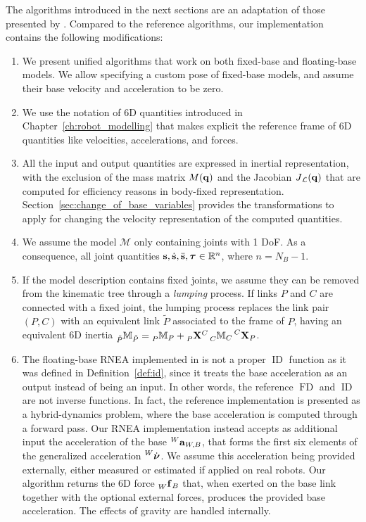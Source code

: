 The algorithms introduced in the next sections are an adaptation of those presented by \textcite{featherstone_rigid_2008}.
Compared to the reference algorithms, our implementation contains the following modifications:
%
\begin{enumerate}
%
\item We present unified algorithms that work on both fixed-base and floating-base models.
We allow specifying a custom pose of fixed-base models, and assume their base velocity and acceleration to be zero.
%
\item We use the notation of 6D quantities introduced in Chapter~\ref{ch:robot_modelling} that makes explicit the reference frame of 6D quantities like velocities, accelerations, and forces.
%
\item All the input and output quantities are expressed in inertial representation, with the exclusion of the mass matrix $M(\Qu)$ and the Jacobian $\jac_\mathcal{L}(\Qu)$ that are computed for efficiency reasons in body-fixed representation.
Section~\ref{sec:change_of_base_variables} provides the transformations to apply for changing the velocity representation of the computed quantities.
%
\item We assume the model $\mathcal{M}$ only containing joints with 1 \ac{DoF}.
As a consequence, all joint quantities $\Shape, \Shaped, \Shapedd, \Torques \in \realn^n$, where $n = N_B - 1$.
%
\item If the model description contains fixed joints, we assume they can be removed from the kinematic tree through a \emph{lumping} process.
If links $P$ and $C$ are connected with a fixed joint, the lumping process replaces the link pair $(P, C)$ with an equivalent link $\tilde{P}$ associated to the frame of $P$, having an equivalent 6D inertia $\masssix[\tilde{P}]_{\tilde{P}} = \masssix[P]_P + \transfor[P]^C \masssix[C]_C \transvel[C]_P$.
%
\item The floating-base \ac{RNEA} implemented in \textcite[Section 9.5]{featherstone_rigid_2008} is not a proper $\operatorname{ID}$ function as it was defined in Definition~\ref{def:id}, since it treats the base acceleration as an output instead of being an input.
In other words, the reference $\operatorname{FD}$ and $\operatorname{ID}$ are not inverse functions.
In fact, the reference implementation is presented as a hybrid-dynamics problem, where the base acceleration is computed through a forward pass.
Our \acs{RNEA} implementation instead accepts as additional input the acceleration of the base $\accsix[W]_{W,B}$, that forms the first six elements of the generalized acceleration $\Nud[W]$.
We assume this acceleration being provided externally, either measured or estimated if applied on real robots.
Our algorithm returns the 6D force $\forcesix[W]_B$ that, when exerted on the base link together with the optional external forces, produces the provided base acceleration.
The effects of gravity are handled internally.
%
\end{enumerate}

